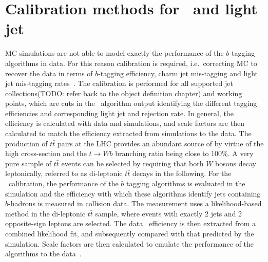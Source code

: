 \label{sec:FTAG}
\section{Calibration methods for \bjet\ and light jet}
\large
MC simulations are not able to model exactly the 
performance of the $b$-tagging algorithms in data. For this reason 
calibration is required, i.e.\ correcting MC to recover the data 
in terms of $b$-tagging efficiency, charm jet mis-tagging and 
light jet mis-tagging rates~\cite{FTAG-2018-01}. The calibration is performed 
for all supported jet collections(TODO: refer back to the object definition chapter)
and working points, which are cuts in the \btagging\ 
algorithm output identifying the different tagging efficiencies 
and corresponding light jet and \cjet rejection rate.
In general, the efficiency is calculated with data and simulations, 
and scale factors are then calculated to match the efficiency extracted 
from simulations to the data.
The production of $t\bar{t}$ 
pairs at the LHC provides an abundant source of \bjets by virtue 
of the high cross-section and the $t \rightarrow Wb$ branching ratio 
being close to 100\%. A very pure sample of $t\bar{t}$ events can be 
selected by requiring that both $W$ bosons decay leptonically, 
referred to as di-leptonic $t\bar{t}$ decays in the following.
For the \bjet\ calibration, the performance of the $b$ tagging 
algorithms is evaluated in the simulation and the efficiency 
with which these algorithms identify jets containing $b$-hadrons 
is measured in collision data. The measurement uses a likelihood-based 
method in the di-leptonic $t\bar{t}$ sample, where
events with exactly 2 jets and 2 opposite-sign leptons are selected.  
The data \bjet\ efficiency is 
then extracted from a combined likelihood fit, and subsequently 
compared with that predicted by the simulation. Scale factors are 
then calculated to emulate the performance of the algorithms to the data~\cite{FTAG-2018-01}.

